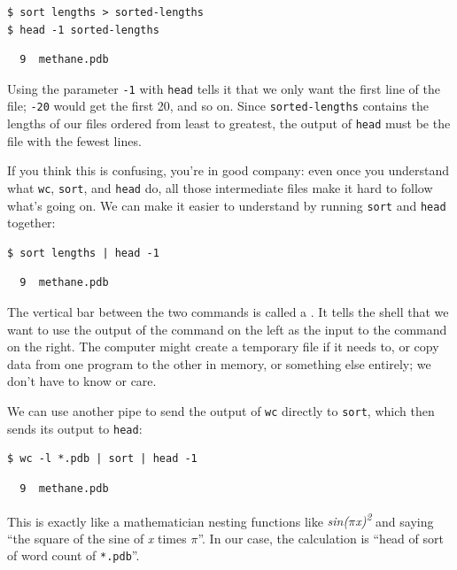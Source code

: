 \documentclass{book}
\begin{document}
\begin{verbatim}
$ sort lengths > sorted-lengths
$ head -1 sorted-lengths
\end{verbatim}

\begin{verbatim}
  9  methane.pdb
\end{verbatim}

Using the parameter \texttt{-1} with \texttt{head} tells it that we only
want the first line of the file; \texttt{-20} would get the first 20,
and so on. Since \texttt{sorted-lengths} contains the lengths of our
files ordered from least to greatest, the output of \texttt{head} must
be the file with the fewest lines.

If you think this is confusing, you're in good company: even once you
understand what \texttt{wc}, \texttt{sort}, and \texttt{head} do, all
those intermediate files make it hard to follow what's going on. We can
make it easier to understand by running \texttt{sort} and \texttt{head}
together:

\begin{verbatim}
$ sort lengths | head -1
\end{verbatim}

\begin{verbatim}
  9  methane.pdb
\end{verbatim}

The vertical bar between the two commands is called a
. It tells the shell that we want to use the
output of the command on the left as the input to the command on the
right. The computer might create a temporary file if it needs to, or
copy data from one program to the other in memory, or something else
entirely; we don't have to know or care.

We can use another pipe to send the output of \texttt{wc} directly to
\texttt{sort}, which then sends its output to \texttt{head}:

\begin{verbatim}
$ wc -l *.pdb | sort | head -1
\end{verbatim}

\begin{verbatim}
  9  methane.pdb
\end{verbatim}

This is exactly like a mathematician nesting functions like
\emph{sin($\pi$x)\textsuperscript{2}} and saying ``the square of the sine of
\emph{x} times $\pi$''. In our case, the calculation is ``head of sort of
word count of \texttt{*.pdb}''.
\end{document}
